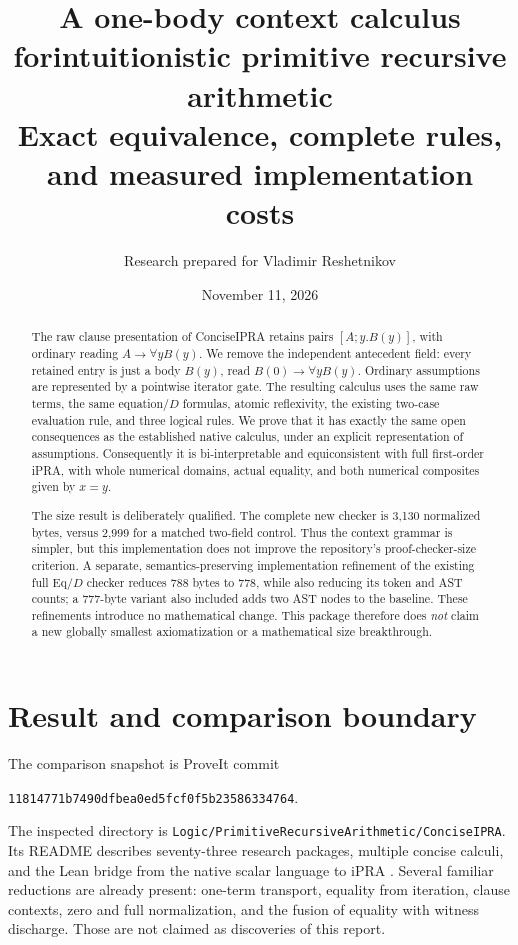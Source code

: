 \documentclass[11pt]{article}
\title{\textbf{A one-body context calculus for\newline intuitionistic primitive recursive arithmetic}\\[6pt]
 \large Exact equivalence, complete rules, and measured implementation costs}
\author{Research prepared for Vladimir Reshetnikov}
\date{November 11, 2026}
\theoremstyle{definition}
\theoremstyle{remark}
\begin{document}
\maketitle
\begin{abstract}
The raw clause presentation of ConciseIPRA retains pairs
$[A;y.B(y)]$, with ordinary reading $A\to\forall y B(y)$.
We remove the independent antecedent field: every retained entry is just
a body $B(y)$, read $B(0)\to\forall yB(y)$. Ordinary assumptions are
represented by a pointwise iterator gate. The resulting calculus uses the
same raw terms, the same equation/$D$ formulas, atomic reflexivity, the
existing two-case evaluation rule, and three logical rules. We prove that
it has exactly the same open consequences as the established native
calculus, under an explicit representation of assumptions. Consequently
it is bi-interpretable and equiconsistent with full first-order iPRA, with
whole numerical domains, actual equality, and both numerical composites
given by $x=y$.

The size result is deliberately qualified. The complete new checker is
3,130 normalized bytes, versus 2,999 for a matched two-field control.
Thus the context grammar is simpler, but this implementation does not
improve the repository's proof-checker-size criterion. A separate,
semantics-preserving implementation refinement of the existing full Eq/$D$
checker reduces 788 bytes to 778, while also reducing its token and AST
counts; a 777-byte variant also included adds two AST nodes to the baseline.
These refinements introduce no mathematical change.
This package therefore does \emph{not} claim a new globally smallest
axiomatization or a mathematical size breakthrough.
\end{abstract}

\section{Result and comparison boundary}

The comparison snapshot is ProveIt commit
\begin{center}\small\texttt{11814771b7490dfbea0ed5fcf0f5b23586334764}.\end{center}
The inspected directory is
\texttt{Logic/PrimitiveRecursiveArithmetic/ConciseIPRA}.
Its README describes seventy-three research packages, multiple concise
calculi, and the Lean bridge from the native scalar language to iPRA
\cite{readme,nativebridge}. Several familiar reductions are already present:
one-term transport, equality from iteration, clause contexts, zero and full
normalization, and the fusion of equality with witness discharge. Those
are not claimed as discoveries of this report.
\end{document}
